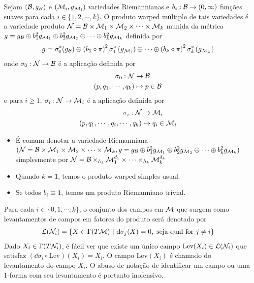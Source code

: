 \begin{deff}
Sejam $(\mathcal{B}, g_{B})$ e $(\mathcal{M}_i, g_{\mathcal{M}_i})$ variedades Riemannianas e $b_i: \mathcal{B} \to (0, \infty)$ funções suaves para cada $i \in \{1, 2, \cdots, k \}$. O produto warped múltiplo de tais variedades é a variedade produto $\mathcal{N} = \mathcal{B} \times \mathcal{M}_1 \times \mathcal{M}_2 \times \cdots \times \mathcal{M}_k $ munida da métrica $g = g_{\mathcal{B}} \oplus b_1^2 g_{\mathcal{M}_1} \oplus b_2^2 g_{\mathcal{M}_2} \oplus \cdots \oplus b_{k}^2 g_{\mathcal{M}_k}$ definida por
\[
g = \sigma_0^{*} (g_{\mathcal{B}}) \oplus \left(b_1 \circ \pi \right)^2 \sigma_1^{*}\left(g_{\mathcal{M}_1} \right ) \oplus \cdots \oplus \left(b_k \circ \pi \right)^2 \sigma_{k}^{*} \left( g_{\mathcal{M}_k} \right)
\]
onde $\sigma_0 : \mathcal{N} \to \mathcal{B}$ é a aplicação definida por
\begin{align*}
\sigma_0: \mathcal{N} &\to \mathcal{B} \\
(p, q_1, \cdots, q_k) &\mapsto p \in \mathcal{B}
\end{align*}
e para $i \geq 1$, $\sigma_i : \mathcal{N} \to \mathcal{M}_i$ é a aplicação definida por
\begin{align*}
\sigma_i: \mathcal{N} &\to \mathcal{M}_i \\
(p, q_1, \cdots, q_i, \cdots, q_k) &\mapsto q_i \in \mathcal{M}_i
\end{align*}
\end{deff}


\begin{oobs}
\begin{itemize} \item É comum denotar a variedade Riemanniana $(\mathcal{N}  =  \mathcal{B} \times \mathcal{M}_1 \times \mathcal{M}_2 \times \cdots \times \mathcal{M}_k, g = g_{\mathcal{B}} \oplus b_1^2 g_{\mathcal{M}_1} \oplus b_2^2 g_{\mathcal{M}_2} \oplus \cdots \oplus b_{k}^2 g_{\mathcal{M}_k})$ simplesmente por $\mathcal{N} = \mathcal{B} \times_{h_1} \mathcal{M}_1^{d_1} \times \cdots \times_{h_k} \mathcal{M}_{k}^{d_k}$
\item Quando $k = 1$, temos o produto warped simples usual. 
\item Se todos $b_i \equiv 1$, temos um produto Riemanniano trivial. 
\end{itemize}
\end{oobs}

\begin{oobs}
    Para cada $i \in \{0, 1, \cdots, k\}$, o conjunto dos campos em $\mathcal{M}$ que surgem como levantamentos de campos em fatores do produto será denotado por
    \[
    \mathcal{L}(\mathcal{N}_i) = \{ X \in \Gamma(T \mathcal{M}) \ \vert \ \mathrm{d} \sigma_j (X) = 0, \text{ seja qual for $j\neq i$} \}
    \]
    Dado $X_i \in \Gamma(T \mathcal{N}_i)$, é fácil ver que existe um único campo $\text{Lev}(X_i) \in \mathcal{L}(\mathcal{N}_i) $ que satisfaz $\left( \dd \sigma_i \circ \text{Lev} \right)(X_i) = X_i$. O campo $\text{Lev}(X_i)$ é chamado do levantamento do campo $X_i$. O abuso de notação de identificar um campo ou uma $1$-forma com seu levantamento é portanto inofensivo.
    \end{oobs}

